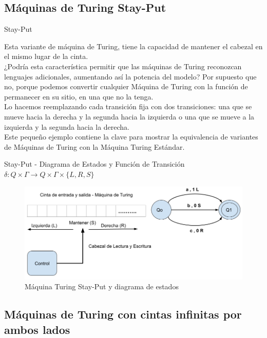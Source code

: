 \documentclass[11pt]{beamer}
\begin{document}
	\subsection{Máquinas de Turing Stay-Put}
	    \begin{frame}{Stay-Put}
			\justifying
			
			Esta variante de máquina de Turing, tiene la capacidad de mantener el cabezal en el mismo lugar de la cinta. \\
			
			¿Podría esta característica permitir que las máquinas de Turing reconozcan lenguajes adicionales, aumentando así la potencia del modelo? Por supuesto que no, porque podemos convertir cualquier Máquina de Turing con la función de permanecer en su sitio, en una que no la tenga. \\
			Lo hacemos reemplazando cada transición fija con dos transiciones: una que se mueve hacia la derecha y la segunda hacia la izquierda o una que se mueve a la izquierda y la segunda hacia la derecha. \\
			Este pequeño ejemplo contiene la clave para mostrar la equivalencia de variantes de Máquinas de Turing con la Máquina Turing Estándar.
			
		\end{frame}
		\begin{frame}{Stay-Put - Diagrama de Estados y Función de Transición }
			\justifying
			$\delta : Q \times \Gamma \rightarrow Q \times \Gamma \times \{ L, R, S \} $\\
			
			\begin{figure}[H]
				\centering
				\includegraphics[scale=0.5]{img/stayput.png}
				\caption{Máquina Turing Stay-Put y diagrama de estados}
				\label{fig: Stay-Put}
			\end{figure}
			
			
		\end{frame}
	\subsection{Máquinas de Turing con cintas infinitas por ambos lados}
	
\end{document}
